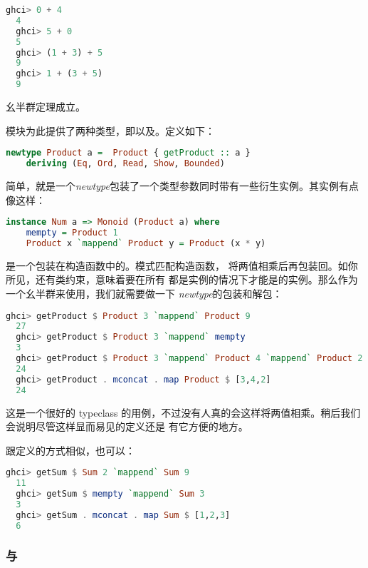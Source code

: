\documentclass[./main.tex]{subfiles}
\begin{document}
\begin{lstlisting}[language=Haskell]
  ghci> 0 + 4
  4
  ghci> 5 + 0
  5
  ghci> (1 + 3) + 5
  9
  ghci> 1 + (3 + 5)
  9
\end{lstlisting}

幺半群定理成立。

模块为此提供了两种类型，即以及。定义如下：

\begin{lstlisting}[language=Haskell]
  newtype Product a =  Product { getProduct :: a }
    deriving (Eq, Ord, Read, Show, Bounded)
\end{lstlisting}

简单，就是一个\textit{newtype}包装了一个类型参数同时带有一些衍生实例。其实例有点像这样：

\begin{lstlisting}[language=Haskell]
  instance Num a => Monoid (Product a) where
    mempty = Product 1
    Product x `mappend` Product y = Product (x * y)
\end{lstlisting}

是一个包装在构造函数中的。模式匹配构造函数，
将两值相乘后再包装回。如你所见，还有类约束，意味着要在所有
都是实例的情况下才能是的实例。那么作为一个幺半群来使用，我们就需要做一下
\textit{newtype}的包装和解包：

\begin{lstlisting}[language=Haskell]
  ghci> getProduct $ Product 3 `mappend` Product 9
  27
  ghci> getProduct $ Product 3 `mappend` mempty
  3
  ghci> getProduct $ Product 3 `mappend` Product 4 `mappend` Product 2
  24
  ghci> getProduct . mconcat . map Product $ [3,4,2]
  24
\end{lstlisting}

这是一个很好的 typeclass 的用例，不过没有人真的会这样将两值相乘。稍后我们会说明尽管这样显而易见的定义还是
有它方便的地方。

跟定义的方式相似，也可以：

\begin{lstlisting}[language=Haskell]
  ghci> getSum $ Sum 2 `mappend` Sum 9
  11
  ghci> getSum $ mempty `mappend` Sum 3
  3
  ghci> getSum . mconcat . map Sum $ [1,2,3]
  6
\end{lstlisting}

\subsubsection*{与}
\end{document}
